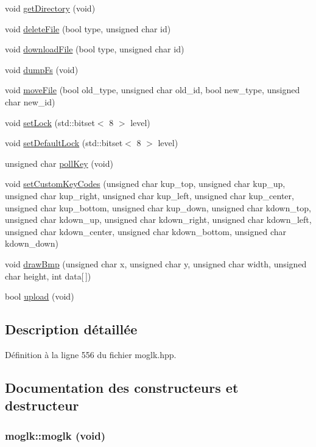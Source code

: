 \begin{CompactItemize}
\item 
void \hyperlink{classmoglk_06a6671f138121034a345e2cbd6497f8}{getDirectory} (void)
\item 
void \hyperlink{classmoglk_a1953b9ffbeb39433686cb30fe72cdab}{deleteFile} (bool type, unsigned char id)
\item 
void \hyperlink{classmoglk_f8a03d73de173bee806acf9d51cba608}{downloadFile} (bool type, unsigned char id)
\item 
void \hyperlink{classmoglk_7f929ca25d08f1c116cd43152b7373f3}{dumpFs} (void)
\item 
void \hyperlink{classmoglk_c2bcc785f03c46e32f27486704bd559a}{moveFile} (bool old\_\-type, unsigned char old\_\-id, bool new\_\-type, unsigned char new\_\-id)
\item 
void \hyperlink{classmoglk_a9d4351888605654a20b9d3e46160ce3}{setLock} (std::bitset$<$ 8 $>$ level)
\item 
void \hyperlink{classmoglk_1f658975ec72ee94a416e03b80d940ec}{setDefaultLock} (std::bitset$<$ 8 $>$ level)
\item 
unsigned char \hyperlink{classmoglk_7892be0a8494f02f08f57981d31932cd}{pollKey} (void)
\item 
void \hyperlink{classmoglk_fbe1a25a8d461d02dd84df8b7a8b796b}{setCustomKeyCodes} (unsigned char kup\_\-top, unsigned char kup\_\-up, unsigned char kup\_\-right, unsigned char kup\_\-left, unsigned char kup\_\-center, unsigned char kup\_\-bottom, unsigned char kup\_\-down, unsigned char kdown\_\-top, unsigned char kdown\_\-up, unsigned char kdown\_\-right, unsigned char kdown\_\-left, unsigned char kdown\_\-center, unsigned char kdown\_\-bottom, unsigned char kdown\_\-down)
\item 
void \hyperlink{classmoglk_38ad099b570c6f81d9a5ae6251ae77d1}{drawBmp} (unsigned char x, unsigned char y, unsigned char width, unsigned char height, int data\mbox{[}$\,$\mbox{]})
\item 
bool \hyperlink{classmoglk_a133809f7d934231f03f1d59fbc88f75}{upload} (void)
\end{CompactItemize}


\subsection{Description détaillée}


Définition à la ligne 556 du fichier moglk.hpp.

\subsection{Documentation des constructeurs et destructeur}
\hypertarget{classmoglk_3f753134676c7d36a96e6d4439cc0348}{
\subsubsection[{moglk}]{\setlength{\rightskip}{0pt plus 5cm}moglk::moglk (void)}}
\label{classmoglk_3f753134676c7d36a96e6d4439cc0348}




